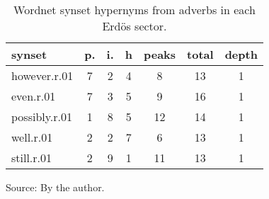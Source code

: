 \begin{table}[h!]
\begin{center}
\caption{Wordnet synset hypernyms from adverbs in each Erd\"os sector.}
	\label{tab:wnrh}
\begin{tabular}{| l || c | c | c || c | c | c |}\hline
{\bf synset} & {\bf p.} & {\bf i.} & {\bf h} & {\bf peaks} & {\bf total} & {\bf depth} \\\hline\hline
however.r.01 & 7  & 2  & 4  & 8  & 13  & 1 \\
even.r.01 & 7  & 3  & 5  & 9  & 16  & 1 \\
possibly.r.01 & 1  & 8  & 5  & 12  & 14  & 1 \\
well.r.01 & 2  & 2  & 7  & 6  & 13  & 1 \\
still.r.01 & 2  & 9  & 1  & 11  & 13  & 1 \\\hline
\end{tabular}
\begin{flushleft}\footnotesize
		Source: By the author.\
\end{flushleft}
\end{center}
\end{table}
